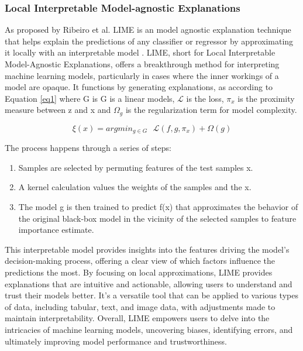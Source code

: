 \documentclass[UKenglish]{uiomasterthesis}
\begin{document}
\subsubsection{Local Interpretable Model-agnostic Explanations}
As proposed by Ribeiro et al. LIME is an model agnostic explanation technique that helps explain the predictions of any classifier or regressor by approximating it locally with an interpretable model \cite{ribeiro_why_2016}. LIME, short for Local Interpretable Model-Agnostic Explanations, offers a breakthrough method for interpreting machine learning models, particularly in cases where the inner workings of a model are opaque. It functions by generating explanations, as according to Equation \ref{eq1} where G is G is a linear models, \begin{math} \mathcal{L} \end{math}
is the loss, \begin{math} \pi_{x}\end{math} is the proximity measure between z and x and \begin{math} \Omega_{g} \end{math} is the regularization term for model complexity. 

\begin{equation}
    \label{eq1}
    \xi (x) = argmin_{{g\in G}} \text{ } \mathcal{L}(f,g,\pi_{x}) + \Omega (g)
\end{equation}

The process happens through a series of steps: 
\begin{enumerate}
    \item Samples are selected by permuting features of the test samples x. 
    \item A kernel calculation values the weights of the samples and the x.
    \item  The model g is then trained to predict f(x) that approximates the behavior of the original black-box model in the vicinity of the selected samples to feature importance estimate.
\end{enumerate} 

This interpretable model provides insights into the features driving the model's decision-making process, offering a clear view of which factors influence the predictions the most. By focusing on local approximations, LIME provides explanations that are intuitive and actionable, allowing users to understand and trust their models better. It's a versatile tool that can be applied to various types of data, including tabular, text, and image data, with adjustments made to maintain interpretability. Overall, LIME empowers users to delve into the intricacies of machine learning models, uncovering biases, identifying errors, and ultimately improving model performance and trustworthiness.
\end{document}
